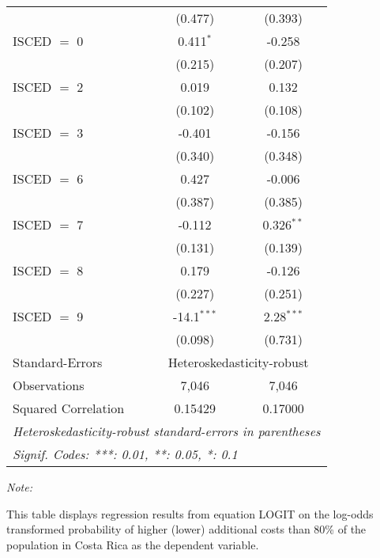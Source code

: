 \begin{table}[htbp!]
\begin{adjustbox}{width = 1\textwidth, max height = 0.95\textheight, center}
\begin{threeparttable}[b]
\begin{tabular}{lcc}
                                 & (0.477)        & (0.393)\\   
            ISCED $=$ 0          & 0.411$^{*}$    & -0.258\\   
                                 & (0.215)        & (0.207)\\   
            ISCED $=$ 2          & 0.019          & 0.132\\   
                                 & (0.102)        & (0.108)\\   
            ISCED $=$ 3          & -0.401         & -0.156\\   
                                 & (0.340)        & (0.348)\\   
            ISCED $=$ 6          & 0.427          & -0.006\\   
                                 & (0.387)        & (0.385)\\   
            ISCED $=$ 7          & -0.112         & 0.326$^{**}$\\   
                                 & (0.131)        & (0.139)\\   
            ISCED $=$ 8          & 0.179          & -0.126\\   
                                 & (0.227)        & (0.251)\\   
            ISCED $=$ 9          & -14.1$^{***}$  & 2.28$^{***}$\\   
                                 & (0.098)        & (0.731)\\   
            \midrule 
            Standard-Errors & \multicolumn{2}{c}{Heteroskedasticity-robust} \\ 
            Observations         & 7,046          & 7,046\\  
            Squared Correlation  & 0.15429        & 0.17000\\  
            \midrule \midrule
            \multicolumn{3}{l}{\emph{Heteroskedasticity-robust standard-errors in parentheses}}\\
            \multicolumn{3}{l}{\emph{Signif. Codes: ***: 0.01, **: 0.05, *: 0.1}}\\
         \end{tabular}
         
         \begin{tablenotes}\item \medskip \textit{Note:}
            \item This table displays regression results from equation LOGIT on the log-odds transformed probability of higher (lower) additional costs than 80\% of the population in Costa Rica as the dependent variable. 
         \end{tablenotes}
      \end{threeparttable}
   \end{adjustbox}
\end{table}


